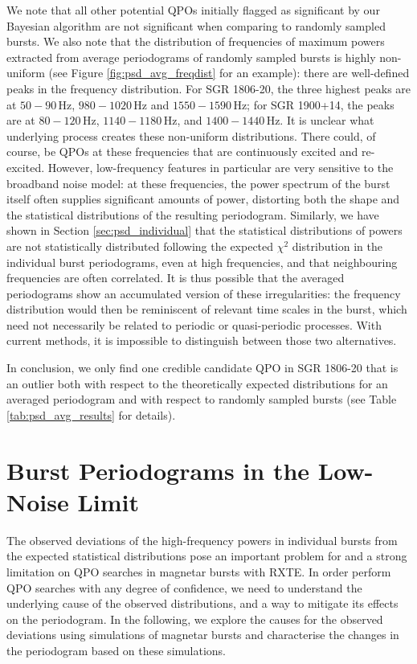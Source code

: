 \documentclass[numberedappendix]{emulateapj}
\newcommand{\hz}{\,\mathrm{Hz}}
\begin{document}
We note that all other potential QPOs initially flagged as significant by our Bayesian algorithm are not significant when comparing to randomly sampled bursts. We also note that the distribution of frequencies of maximum powers extracted from average periodograms of randomly sampled bursts is highly non-uniform (see Figure \ref{fig:psd_avg_freqdist} for an example): there are well-defined peaks in the frequency distribution. For SGR 1806-20, the three highest peaks are at $50 - 90 \hz$, $980 - 1020 \hz$ and $1550 - 1590 \hz$; for SGR 1900+14, the peaks are at $80 - 120 \hz$, $1140 - 1180 \hz$, and $1400 - 1440 \hz$. It is unclear what underlying process creates these non-uniform distributions. There could, of course, be QPOs at these frequencies that are continuously excited and re-excited. However, low-frequency features in particular are very sensitive to the broadband noise model: at these frequencies, the power spectrum of the burst itself often supplies significant amounts of power, distorting both the shape and the statistical distributions of the resulting periodogram. Similarly, we have shown in Section \ref{sec:psd_individual} that the statistical distributions of powers are not statistically distributed following the expected $\chi^2$ distribution in the individual burst periodograms, even at high frequencies, and that neighbouring frequencies are often correlated. It is thus possible that the averaged periodograms show an accumulated version of these irregularities: the frequency distribution would then be reminiscent of relevant time scales in the burst, which need not necessarily be related to periodic or quasi-periodic processes. With current methods, it is impossible to distinguish between those two alternatives.

In conclusion, we only find one credible candidate QPO in SGR 1806-20 that is an outlier both with respect to the theoretically expected distributions for an averaged periodogram and with respect to randomly sampled bursts (see Table \ref{tab:psd_avg_results} for details).


\section{Burst Periodograms in the Low-Noise Limit}
\label{sec:weakbursts}

The observed deviations of the high-frequency powers in individual bursts from the expected statistical distributions pose an important problem for and a strong limitation on QPO searches in magnetar bursts with RXTE. In order perform QPO searches with any degree of confidence, we need to understand the underlying cause of the observed distributions, and a way to mitigate its effects on the periodogram. In the following, we explore the causes for the observed deviations using simulations of magnetar bursts and characterise the changes in the periodogram based on these simulations. 
\end{document}
